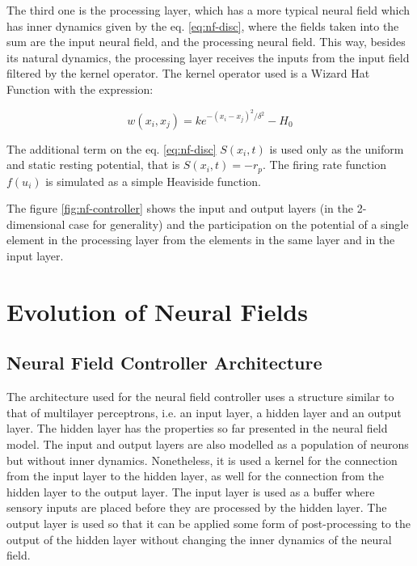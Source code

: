 The third one is the processing layer, which has a more typical neural
field which has inner dynamics given by the eq. \ref{eq:nf-disc},
where the fields taken into the sum are the input neural field, and
the processing neural field. This way, besides its natural dynamics,
the processing layer receives the inputs from the input field filtered
by the kernel operator. The kernel operator used is a Wizard Hat
Function with the expression:

\begin{equation}
  w(x_i,x_j)=ke^{-(x_i-x_j)^2/\delta^2}-H_0
\end{equation}

The additional term on the eq. \ref{eq:nf-disc} $S(x_i,t)$ is used
only as the uniform and static resting potential, that is
$S(x_i,t)=-r_p$.
The firing rate function $f(u_i)$ is simulated as a simple Heaviside
function.

The figure \ref{fig:nf-controller} shows the input and output layers
(in the 2-dimensional case for generality) and the participation on
the potential of a single element in the processing layer from the
elements in the same layer and in the input layer.




\section{Evolution of Neural Fields}
\subsection{Neural Field Controller Architecture}
The architecture used for the neural field controller uses a structure
similar to that of multilayer perceptrons, i.e. an input layer, a
hidden layer and an output layer. The hidden layer has the properties
so far presented in the neural field model. The input and output layers are also
modelled as a population of neurons but without inner
dynamics. Nonetheless, it is used a kernel for the connection from the
input layer to the hidden layer, as well for the connection from the
hidden layer to the output layer.
The input layer is used as a buffer where sensory inputs are placed
before they are processed by the hidden layer. The output layer is
used so that it can be applied some form of post-processing to the
output of the hidden layer without changing the inner dynamics of the
neural field.

